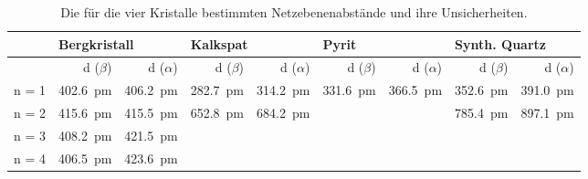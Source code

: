 \begin{table}[h!]
    \centering
    \small
    \caption{%
        Die f\"ur die vier Kristalle bestimmten Netzebenenabst\"ande und ihre
		Unsicherheiten.
    }
    \label{tab:results:spektra:otherCrystals}
    \begin{tabular}{lrrrrrrrr}
        \toprule
        &
        \multicolumn{2}{l}{Bergkristall}         &
        \multicolumn{2}{l}{Kalkspat}             &
        \multicolumn{2}{l}{Pyrit}                &
        \multicolumn{2}{l}{Synth. Quartz} \\
        \midrule

        &
        d ($\beta$)  &
        d ($\alpha$) &
        d ($\beta$)  &
        d ($\alpha$) &
        d ($\beta$)  &
        d ($\alpha$) &
        d ($\beta$)  &
        d ($\alpha$) \\

        \midrule


        n = 1              &
        \SI{402.6}{\pico\meter} &
        \SI{406.2}{\pico\meter} &
        \SI{282.7}{\pico\meter} &
        \SI{314.2}{\pico\meter} &
        \SI{331.6}{\pico\meter} &
        \SI{366.5}{\pico\meter} &
        \SI{352.6}{\pico\meter} &
        \SI{391.0}{\pico\meter} \\


        n = 2                   &
        \SI{415.6}{\pico\meter} & %
        \SI{415.5}{\pico\meter} & %
        \SI{652.8}{\pico\meter} & %
        \SI{684.2}{\pico\meter} & %
                                &
                                &
        \SI{785.4}{\pico\meter} & %
        \SI{897.1}{\pico\meter} \\ %

        n = 3                   &
        \SI{408.2}{\pico\meter} & %
        \SI{421.5}{\pico\meter} & %
                                &
                                &
                                &
                                &
                                &
                                \\

        n = 4                   &
        \SI{406.5}{\pico\meter} & %
        \SI{423.6}{\pico\meter} & %
                                &
                                &
                                &
                                &
                                &
                                \\


\end{tabular}
\end{table}
